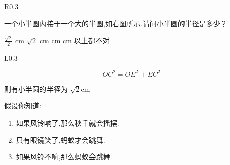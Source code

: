 \documentclass[answers]{exam}
\begin{document}
\begin{questions}
\begin{minipage}[t]{0.95\textwidth}
\begin{wrapfigure}{R}{0.3\textwidth}
		\end{wrapfigure}

		一个小半圆内接于一个大的半圆,如右图所示.请问小半圆的半径是多少？

		\begin{oneparchoices}
			\choice \( \frac{\sqrt{2}}{2} \) cm
			\CorrectChoice \( \sqrt{2} \) cm
			 cm
			 cm
			\choice 以上都不对
		\end{oneparchoices}
	\end{minipage}

	\begin{solution}
		\begin{minipage}[t]{0.95\textwidth}
			\begin{wrapfigure}{L}{0.3\textwidth}
			\end{wrapfigure}

			\begin{equation*}
				OC^2 = OE^2 + EC^2
			\end{equation*}

			则有小半圆的半径为 \( \sqrt{2} \)cm
		\end{minipage}
		\vspace{2cm}

	\end{solution}

	\question 假设你知道:
	\begin{enumerate}[label=\roman*] 
		\item 如果风铃响了,那么秋千就会摇摆.
		\item 只有眼镜笑了,蚂蚁才会跳舞.
		\item 如果风铃不响,那么蚂蚁会跳舞.
	\end{enumerate}


\end{questions}
\end{document}
